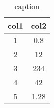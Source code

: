 \begin{table}
 \caption{caption}
 \label{tab:sample}
 \centering
 \begin{tabular}{cc}
 \toprule 
    col1 & col2 \\
     \midrule
     1 & 0.8 \\
     2 & 12 \\
     3 & 234 \\
     4 & 42 \\
     5 & 1.28 \\
 \bottomrule
 \end{tabular}
\end{table}